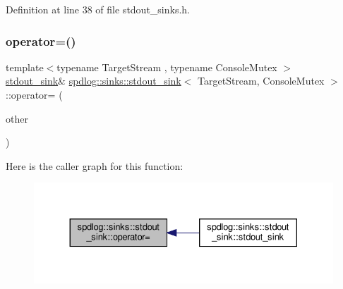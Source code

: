 Definition at line 38 of file stdout\+\_\+sinks.\+h.

\mbox{\label{classspdlog_1_1sinks_1_1stdout__sink_a0bee23de61cbea7c1dfb5e8712a98d74}} 
\subsubsection{\texorpdfstring{operator=()}{operator=()}}
{\footnotesize\ttfamily template$<$typename Target\+Stream , typename Console\+Mutex $>$ \\
\hyperlink{classspdlog_1_1sinks_1_1stdout__sink}{stdout\+\_\+sink}\& \hyperlink{classspdlog_1_1sinks_1_1stdout__sink}{spdlog\+::sinks\+::stdout\+\_\+sink}$<$ Target\+Stream, Console\+Mutex $>$\+::operator= (\begin{DoxyParamCaption}\item[{const \hyperlink{classspdlog_1_1sinks_1_1stdout__sink}{stdout\+\_\+sink}$<$ Target\+Stream, Console\+Mutex $>$ \&}]{other }\end{DoxyParamCaption})\hspace{0.3cm}{\ttfamily [delete]}}

Here is the caller graph for this function\+:
\nopagebreak
\begin{figure}[H]
\begin{center}
\leavevmode
\includegraphics[width=330pt]{classspdlog_1_1sinks_1_1stdout__sink_a0bee23de61cbea7c1dfb5e8712a98d74_icgraph}
\end{center}
\end{figure}
\mbox{\label{classspdlog_1_1sinks_1_1stdout__sink_ada2b3ef5a7821873df46ebda72b77e6c}} 
